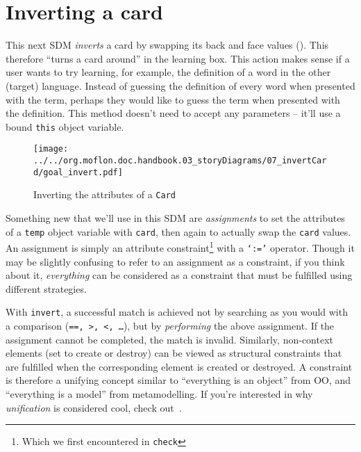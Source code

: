 \newpage
\hypertarget{sec:invertCard}{}
\chapter{Inverting a card}
\genHeader

This next SDM \emph{inverts} a card by swapping its back and face values (). This therefore ``turns a card around'' in the learning
box. This action makes sense if a user wants to try learning, for example, the definition of a word in the other (target) language. Instead of guessing the
definition of every word when presented with the term, perhaps they would like to guess the term when presented with the definition. This method doesn't need to
accept any parameters -- it'll use a bound \texttt{this} object variable.

\vspace{0.5cm}

\begin{figure}[htbp]
	\centering
    \texttt{[image: ../../org.moflon.doc.handbook.03\_storyDiagrams/07\_invertCard/goal\_invert.pdf]}
 	\caption{Inverting the attributes of a \texttt{Card}}
 	\label{fig:goal_invert}
\end{figure}
\FloatBarrier

Something new that we'll use in this SDM are \emph{assignments} to set the attributes of a \texttt{temp} object variable with \texttt{card},
then again to actually swap the \texttt{card} values. An assignment is simply an attribute constraint\footnote{Which we first encountered in \texttt{check}}
with a \texttt{`:='} operator. Though it may be slightly confusing to refer to an assignment as a constraint, if you think about it, \emph{everything} can be
considered as a constraint that must be fulfilled using different strategies.

With \texttt{invert}, a successful match is achieved not by searching as you would with a comparison (\texttt{==, >, <, \ldots}), but by \emph{performing} the
above assignment. If the assignment cannot be completed, the match is invalid. Similarly, non-context elements (set to create or destroy) can be viewed as
structural constraints that are fulfilled when the corresponding element is created or destroyed.  A constraint is therefore a unifying concept similar to
``everything is an object'' from OO, and ``everything is a model'' from metamodelling.  If you're interested in why \emph{unification} is considered cool, check
out~\cite{BEZ05}.





